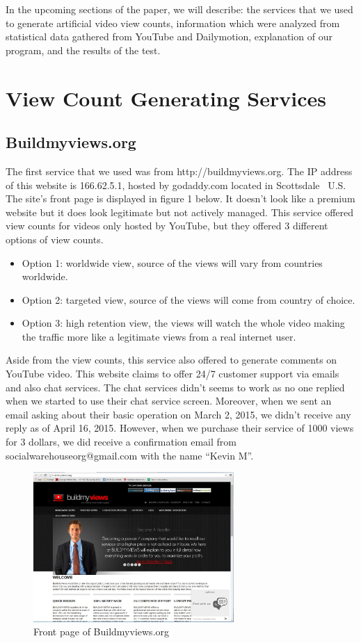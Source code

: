 \documentclass[conference]{IEEEtran}
\begin{document}
In the upcoming sections of the paper, we will describe: the services that we used to generate artificial video view counts, information which were analyzed from statistical data gathered from YouTube and Dailymotion, explanation of our program, and the results of the test.

\section{View Count Generating Services}

\subsection{Buildmyviews.org}
The first service that we used was from http://buildmyviews.org. The IP address of this website is 166.62.5.1, hosted by godaddy.com located in Scottsdale~\cite{c6} U.S. The site’s front page is displayed in figure 1 below. It doesn’t look like a premium website but it does look legitimate but not actively managed. This service offered view counts for videos only hosted by YouTube, but they offered 3 different options of view counts.

\begin{itemize}
  \item Option 1: worldwide view, source of the views will vary from countries worldwide.
  \item Option 2: targeted view, source of the views will come from country of choice.
  \item Option 3: high retention view, the views will watch the whole video making the traffic more like a legitimate views from a real internet user.
\end{itemize}

Aside from the view counts, this service also offered to generate comments on YouTube video. This website claims to offer 24/7 customer support via emails and also chat services. The chat services didn’t seems to work as no one replied when we started to use their chat service screen. Moreover, when we sent an email asking about their basic operation on March 2, 2015, we didn’t receive any reply as of April 16, 2015. However, when we purchase their service of 1000 views for 3 dollars, we did receive a confirmation email from socialwarehouseorg@gmail.com with the name ``Kevin M''.

\begin{figure}
  \centering
  \includegraphics[width=3.0in]{fig1}
  \caption{Front page of Buildmyviews.org}
\end{figure}
\end{document}
